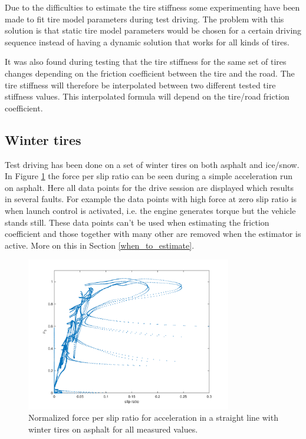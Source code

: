 Due to the difficulties to estimate the tire stiffness some experimenting have been made to fit tire model parameters during test driving. The problem with this solution is that static tire model parameters would be chosen for a certain driving sequence instead of having a dynamic solution that works for all kinds of tires. 

It was also found during testing that the tire stiffness for the same set of tires changes depending on the friction coefficient between the tire and the road. The tire stiffness will therefore be interpolated between two different tested tire stiffness values. This interpolated formula will depend on the tire/road friction coefficient. 

\subsection{Winter tires}
\label{winter_tire}
Test driving has been done on a set of winter tires on both asphalt and ice/snow. In Figure \ref{slip_kraft_olika_acc_uncensored} the force per slip ratio can be seen during a simple acceleration run on asphalt. Here all data points for the drive session are displayed which results in several faults. For example the data points with high force at zero slip ratio is when launch control is activated, i.e. the engine generates torque but the vehicle stands still. These data points can't be used when estimating the friction coefficient and those together with many other are removed when the estimator is active. More on this in Section \ref{when_to_estimate}.   

\begin{figure}[h]
	\centering
	\includegraphics[width=0.8\textwidth]{Pictures/slip_kraft_olika_acc_uncensored}
	\caption {Normalized force per slip ratio for acceleration in a straight line with winter tires on asphalt for all measured values.}
	\label{slip_kraft_olika_acc_uncensored}
\end{figure}

